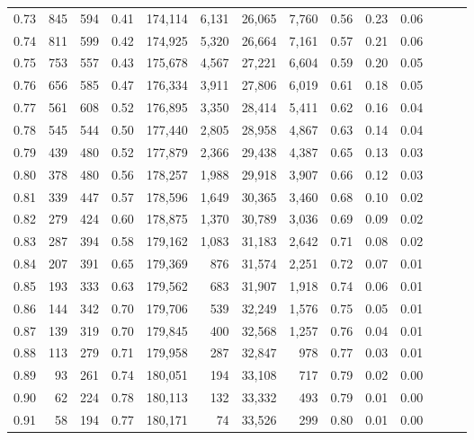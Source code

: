 \begin{tabular}{rrrrrrrrrrrrrr}
0.73 &    845 &  594 &  0.41 &  174,114 &    6,131 &  26,065 &   7,760 &  0.56 &  0.23 &      0.06 \\
0.74 &    811 &  599 &  0.42 &  174,925 &    5,320 &  26,664 &   7,161 &  0.57 &  0.21 &      0.06 \\
0.75 &    753 &  557 &  0.43 &  175,678 &    4,567 &  27,221 &   6,604 &  0.59 &  0.20 &      0.05 \\
0.76 &    656 &  585 &  0.47 &  176,334 &    3,911 &  27,806 &   6,019 &  0.61 &  0.18 &      0.05 \\
0.77 &    561 &  608 &  0.52 &  176,895 &    3,350 &  28,414 &   5,411 &  0.62 &  0.16 &      0.04 \\
0.78 &    545 &  544 &  0.50 &  177,440 &    2,805 &  28,958 &   4,867 &  0.63 &  0.14 &      0.04 \\
0.79 &    439 &  480 &  0.52 &  177,879 &    2,366 &  29,438 &   4,387 &  0.65 &  0.13 &      0.03 \\
0.80 &    378 &  480 &  0.56 &  178,257 &    1,988 &  29,918 &   3,907 &  0.66 &  0.12 &      0.03 \\
0.81 &    339 &  447 &  0.57 &  178,596 &    1,649 &  30,365 &   3,460 &  0.68 &  0.10 &      0.02 \\
0.82 &    279 &  424 &  0.60 &  178,875 &    1,370 &  30,789 &   3,036 &  0.69 &  0.09 &      0.02 \\
0.83 &    287 &  394 &  0.58 &  179,162 &    1,083 &  31,183 &   2,642 &  0.71 &  0.08 &      0.02 \\
0.84 &    207 &  391 &  0.65 &  179,369 &      876 &  31,574 &   2,251 &  0.72 &  0.07 &      0.01 \\
0.85 &    193 &  333 &  0.63 &  179,562 &      683 &  31,907 &   1,918 &  0.74 &  0.06 &      0.01 \\
0.86 &    144 &  342 &  0.70 &  179,706 &      539 &  32,249 &   1,576 &  0.75 &  0.05 &      0.01 \\
0.87 &    139 &  319 &  0.70 &  179,845 &      400 &  32,568 &   1,257 &  0.76 &  0.04 &      0.01 \\
0.88 &    113 &  279 &  0.71 &  179,958 &      287 &  32,847 &     978 &  0.77 &  0.03 &      0.01 \\
0.89 &     93 &  261 &  0.74 &  180,051 &      194 &  33,108 &     717 &  0.79 &  0.02 &      0.00 \\
0.90 &     62 &  224 &  0.78 &  180,113 &      132 &  33,332 &     493 &  0.79 &  0.01 &      0.00 \\
0.91 &     58 &  194 &  0.77 &  180,171 &       74 &  33,526 &     299 &  0.80 &  0.01 &      0.00 \\

\end{tabular}
